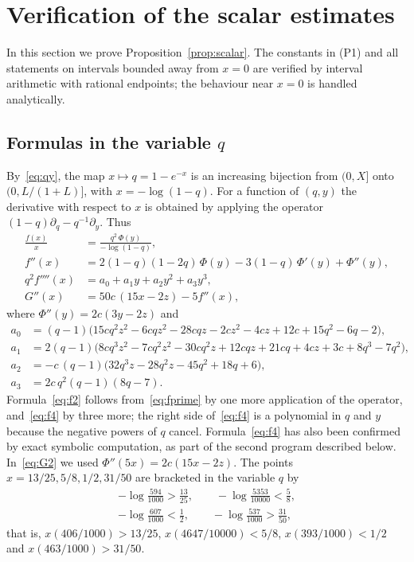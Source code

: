 \documentclass{amsart}
\numberwithin{equation}{section}
\numberwithin{table}{section}
\theoremstyle{definition}
\theoremstyle{remark}
\begin{document}
\section{Verification of the scalar estimates}\label{sec:verification}

In this section we prove Proposition~\ref{prop:scalar}. The constants in (P1) and all statements on intervals bounded away from $x=0$ are verified by interval arithmetic with rational endpoints; the behaviour near $x=0$ is handled analytically.

\subsection{\texorpdfstring{Formulas in the variable $q$}{Formulas in the variable q}}
By~\eqref{eq:qy}, the map $x\mapsto q=1-e^{-x}$ is an increasing bijection from $(0,X]$ onto $(0,L/(1+L)]$, with $x=-\log(1-q)$. For a function of $(q,y)$ the derivative with respect to $x$ is obtained by applying the operator $(1-q)\partial_q-q^{-1}\partial_y$. Thus
\begin{align}
\frac{f(x)}{x}&=\frac{q^2\,\Phi(y)}{-\log(1-q)},\label{eq:ratio}\\
f''(x)&=2(1-q)(1-2q)\,\Phi(y)-3(1-q)\,\Phi'(y)+\Phi''(y),\label{eq:f2}\\
q^2f''''(x)&=a_0+a_1y+a_2y^2+a_3y^3,\label{eq:f4}\\
G''(x)&=50c\,(15x-2z)-5f''(x),\label{eq:G2}
\end{align}
where $\Phi''(y)=2c(3y-2z)$ and
\begin{align*}
a_0&=(q-1)\bigl(15cq^2z^2-6cqz^2-28cqz-2cz^2-4cz+12c+15q^2-6q-2\bigr),\\
a_1&=2(q-1)\bigl(8cq^3z^2-7cq^2z^2-30cq^2z+12cqz+21cq+4cz+3c+8q^3-7q^2\bigr),\\
a_2&=-c\,(q-1)\bigl(32q^3z-28q^2z-45q^2+18q+6\bigr),\\
a_3&=2c\,q^2(q-1)(8q-7).
\end{align*}
Formula~\eqref{eq:f2} follows from~\eqref{eq:fprime} by one more application of the operator, and~\eqref{eq:f4} by three more; the right side of~\eqref{eq:f4} is a polynomial in $q$ and $y$ because the negative powers of $q$ cancel. Formula~\eqref{eq:f4} has also been confirmed by exact symbolic computation, as part of the second program described below. In~\eqref{eq:G2} we used $\Phi''(5x)=2c(15x-2z)$. The points $x=13/25,5/8,1/2,31/50$ are bracketed in the variable $q$ by
\begin{equation}\label{eq:brackets}
\begin{gathered}
-\log\tfrac{594}{1000}>\tfrac{13}{25},\qquad -\log\tfrac{5353}{10000}<\tfrac58,\\
-\log\tfrac{607}{1000}<\tfrac12,\qquad -\log\tfrac{537}{1000}>\tfrac{31}{50},
\end{gathered}
\end{equation}
that is, $x(406/1000)>13/25$, $x(4647/10000)<5/8$, $x(393/1000)<1/2$ and $x(463/1000)>31/50$.
\end{document}
